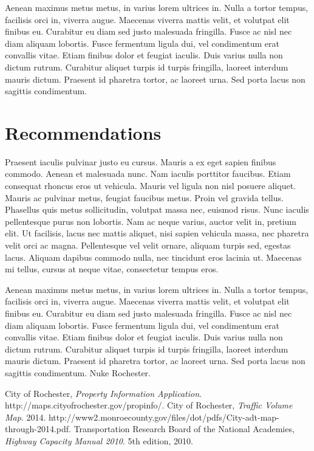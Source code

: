 \documentclass{report}
\begin{document}
Aenean maximus metus metus, in varius lorem ultrices in. Nulla a tortor tempus, facilisis orci in, viverra augue. Maecenas viverra mattis velit, et volutpat elit finibus eu. Curabitur eu diam sed justo malesuada fringilla. Fusce ac nisl nec diam aliquam lobortis. Fusce fermentum ligula dui, vel condimentum erat convallis vitae. Etiam finibus dolor et feugiat iaculis. Duis varius nulla non dictum rutrum. Curabitur aliquet turpis id turpis fringilla, laoreet interdum mauris dictum. Praesent id pharetra tortor, ac laoreet urna. Sed porta lacus non sagittis condimentum.
\noindent\section*{Recommendations}
Praesent iaculis pulvinar justo eu cursus. Mauris a ex eget sapien finibus commodo. Aenean et malesuada nunc. Nam iaculis porttitor faucibus. Etiam consequat rhoncus eros ut vehicula. Mauris vel ligula non nisl posuere aliquet. Mauris ac pulvinar metus, feugiat faucibus metus. Proin vel gravida tellus. Phasellus quis metus sollicitudin, volutpat massa nec, euismod risus. Nunc iaculis pellentesque purus non lobortis. Nam ac neque varius, auctor velit in, pretium elit. Ut facilisis, lacus nec mattis aliquet, nisi sapien vehicula massa, nec pharetra velit orci ac magna. Pellentesque vel velit ornare, aliquam turpis sed, egestas lacus. Aliquam dapibus commodo nulla, nec tincidunt eros lacinia ut. Maecenas mi tellus, cursus at neque vitae, consectetur tempus eros.

Aenean maximus metus metus, in varius lorem ultrices in. Nulla a tortor tempus, facilisis orci in, viverra augue. Maecenas viverra mattis velit, et volutpat elit finibus eu. Curabitur eu diam sed justo malesuada fringilla. Fusce ac nisl nec diam aliquam lobortis. Fusce fermentum ligula dui, vel condimentum erat convallis vitae. Etiam finibus dolor et feugiat iaculis. Duis varius nulla non dictum rutrum. Curabitur aliquet turpis id turpis fringilla, laoreet interdum mauris dictum. Praesent id pharetra tortor, ac laoreet urna. Sed porta lacus non sagittis condimentum.
Nuke Rochester.

\begin{thebibliography}{9}
    City of Rochester,
    \emph{Property Information Application}.
    http://maps.cityofrochester.gov/propinfo/.
    City of Rochester,
    \emph{Traffic Volume Map}.
    2014.
    http://www2.monroecounty.gov/files/dot/pdfs/City-adt-map-through-2014.pdf.
    Transportation Research Board of the National Academies,
    \emph{Highway Capacity Manual 2010}.
    5th edition,
    2010.
\end{thebibliography}
\end{document}
